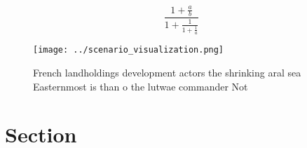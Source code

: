 \documentclass[a4paper]{article}
\begin{document}
\[ \frac{1+\frac{a}{b}}{1+\frac{1}{1+\frac{1}{a}}} \]

\begin{figure}
\centering
\texttt{[image: ../scenario\_visualization.png]}
\caption{French landholdings development actors the shrinking aral sea Easternmost is than o the lutwae commander Not 
}
\end{figure}
 
\section{Section}
\end{document}
